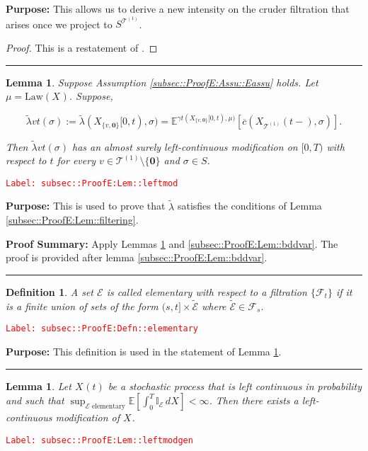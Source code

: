 \documentclass[12pt]{article}
\newcommand{\mb}{\mathbb}
\newcommand{\mc}{\mathcal}
\newcommand{\ov}{\overline}
\newcommand{\te}{\text}
\newcommand{\tr}{\textcolor{red}}
\newcommand{\labe}[1]{\tr{\texttt{Label: #1}}}
\newcommand{\purpose}{\textbf{Purpose: }}
\newcommand{\pfsum}{\textbf{Proof Summary: }}
\newcommand{\lin}{\rule{\linewidth}{0.4 pt}}
\newcommand{\ex}[1]{\mb{E}\left[#1\right]}			%
\newcommand{\exmu}[2]{\mb{E}^{#1}\left[#2\right]}	%
\renewcommand{\root}{\mathbf{0}}				%
\renewcommand{\v}{v}							%
\renewcommand{\S}{S}							%
\newcommand{\s}{\sigma}							%
\newcommand{\T}{T}								%
\renewcommand{\t}{t}							%
\renewcommand{\tt}{s}							%
\newcommand{\F}{\mc{F}}							%
\newcommand{\X}{X}								%
\newcommand{\carp}[1]{^{#1}}					%
\newcommand{\vsi}[1]{^{#1}}						%
\newcommand{\cind}[1]{_{#1}}					%
\newcommand{\tp}[1]{(#1)}						%
\newcommand{\tip}[1]{#1}						%
\newcommand{\ts}[1]{_{#1}}						%
\newcommand{\IGrg}{\ov{c}}						%
\newcommand{\tree}{\mc{T}}						%
\newcommand{\sln}[1]{^{(#1)}}						%
\newcommand{\alt}[1]{\widetilde{#1}}			%
\newcommand{\m}{\mu}							%
\newcommand{\cm}{\gamma}						%
\newcommand{\law}{\te{Law}}						%
\newcommand{\evnt}{\mc{E}}						%
\newcommand{\crate}{\alt{\lambda}}				%
\newtheorem{lem}[thms]{Lemma}
\newtheorem{defn}[thms]{Definition}
\begin{document}
\purpose This allows us to derive a new intensity on the cruder filtration that arises once we project to \(\S\carp{\tree\sln{1}}\).

\begin{proof}
This is a restatement of \cite[Theorem 14.3.III]{DalVer08}.
\end{proof}

\lin

\begin{lem}
Suppose Assumption \ref{subsec::ProofE:Assu::Eassu} holds. Let \(\m{}{}{} = \law(\X\cind{}\tip{})\). Suppose,

\[\crate{\v}{\t}(\s) := \crate{}{}(\X\cind{\{\v,\root\}}\tip{[0,\t)},\s) = \exmu{\cm{\t}(\X\cind{\{\v,\root\}}\tip{[0,\t)},\m{}{}{})}{\IGrg(\X\cind{\tree\sln{1}}\tp{\t-},\s)}.\]


Then \(\crate{\v}{\t}(\s)\) has an almost surely left-continuous modification on \([0,\T)\) with respect to \(\t\) for every \(\v \in \tree\sln{1}\setminus\{\root\}\) and \(\s \in \S\).
\label{subsec::ProofE:Lem::leftmod}
\end{lem}
\labe{subsec::ProofE:Lem::leftmod}

\purpose This is used to prove that \(\crate{}{}\) satisfies the conditions of Lemma \ref{subsec::ProofE:Lem::filtering}.

\pfsum Apply Lemmas \ref{subsec::ProofE:Lem::leftmodgen} and \ref{subsec::ProofE:Lem::bddvar}. The proof is provided after lemma \ref{subsec::ProofE:Lem::bddvar}.

\lin

\begin{defn}
A set \(\evnt{}\) is called elementary with respect to a filtration \(\{\F\vsi{}\ts{\t}\}\) if it is a finite union of sets of the form \((\tt,\t]\times \alt{\evnt}\) where \(\alt{\evnt} \in \F\vsi{}\ts{\tt}\).
\label{subsec::ProofE:Defn::elementary}
\end{defn}
\labe{subsec::ProofE:Defn::elementary}

\purpose This definition is used in the statement of Lemma \ref{subsec::ProofE:Lem::leftmodgen}.

\lin

\begin{lem}
Let \(\X\cind{}\tp{\t}\) be a stochastic process that is left continuous in probability and such that \(\sup_{\evnt{}\te{ elementary}}\ex{\int_0^\T \mb{I}_\evnt{}\,d\X\cind{}\tip{}} < \infty\). Then there exists a left-continuous modification of \(\X\cind{}\tip{}\).
\label{subsec::ProofE:Lem::leftmodgen}
\end{lem}
\labe{subsec::ProofE:Lem::leftmodgen}
\end{document}
